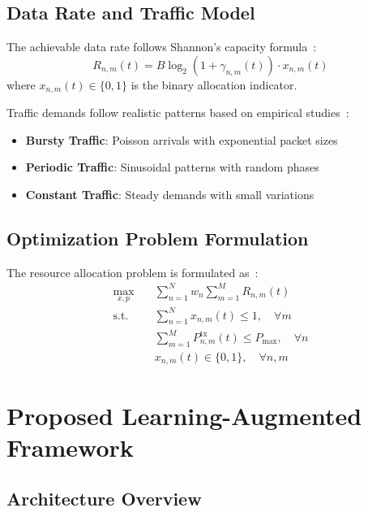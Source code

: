 \documentclass[conference]{IEEEtran}
\begin{document}
\subsection{Data Rate and Traffic Model}

The achievable data rate follows Shannon's capacity formula~\cite{tse_fundamentals}:
\begin{equation}
R_{n,m}(t) = B \log_2(1 + \gamma_{n,m}(t)) \cdot x_{n,m}(t)
\end{equation}
where $x_{n,m}(t) \in \{0,1\}$ is the binary allocation indicator.

Traffic demands follow realistic patterns based on empirical studies~\cite{qos_wireless}:
\begin{itemize}
    \item \textbf{Bursty Traffic}: Poisson arrivals with exponential packet sizes
    \item \textbf{Periodic Traffic}: Sinusoidal patterns with random phases
    \item \textbf{Constant Traffic}: Steady demands with small variations
\end{itemize}

\subsection{Optimization Problem Formulation}

The resource allocation problem is formulated as~\cite{boyd_convex}:
\begin{align}
\max_{x,p} \quad &\sum_{n=1}^{N} w_n \sum_{m=1}^{M} R_{n,m}(t) \label{eq:objective}\\
\text{s.t.} \quad &\sum_{n=1}^{N} x_{n,m}(t) \leq 1, \quad \forall m \label{eq:rb_constraint}\\
&\sum_{m=1}^{M} P_{n,m}^{\text{tx}}(t) \leq P_{\max}, \quad \forall n \label{eq:power_constraint}\\
&x_{n,m}(t) \in \{0,1\}, \quad \forall n,m \label{eq:binary_constraint}
\end{align}

\section{Proposed Learning-Augmented Framework}

\subsection{Architecture Overview}
\end{document}
